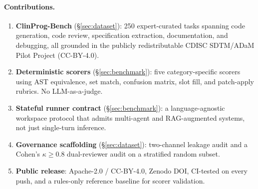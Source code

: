 \paragraph{Contributions.}
\begin{enumerate}
  \item \textbf{ClinProg-Bench} (\S\ref{sec:dataset}): 250 expert-curated tasks
    spanning code generation, code review, specification extraction,
    documentation, and debugging, all grounded in the publicly redistributable
    CDISC SDTM/ADaM Pilot Project (CC-BY-4.0).
  \item \textbf{Deterministic scorers} (\S\ref{sec:benchmark}): five
    category-specific scorers using AST equivalence, set match, confusion
    matrix, slot fill, and patch-apply rubrics. No LLM-as-a-judge.
  \item \textbf{Stateful runner contract} (\S\ref{sec:benchmark}): a
    language-agnostic workspace protocol that admits multi-agent and
    RAG-augmented systems, not just single-turn inference.
  \item \textbf{Governance scaffolding} (\S\ref{sec:dataset}): two-channel
    leakage audit and a Cohen's $\kappa \geq 0.8$ dual-reviewer audit on a
    stratified random subset.
  \item \textbf{Public release}: Apache-2.0 / CC-BY-4.0, Zenodo DOI, CI-tested
    on every push, and a rules-only reference baseline for scorer validation.
\end{enumerate}
